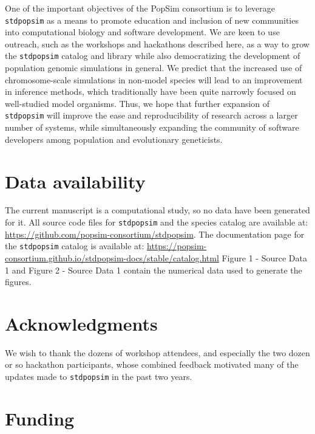 \documentclass[hidelinks]{article}
\newcommand{\stdpopsim}{\texttt{stdpopsim}\xspace}
\begin{document}
One of the important objectives of the PopSim consortium is to leverage \stdpopsim as a means to promote education and inclusion of new communities into
computational biology and software development.
We are keen to use outreach, such as the workshops and hackathons described here, 
as a way to grow the \stdpopsim catalog and library while also democratizing the development of population genomic simulations in general.
We predict that the increased use of chromosome-scale simulations in non-model species will lead to an improvement in inference methods,
which traditionally have been quite narrowly focused on well-studied model organisms.
Thus, we hope that further expansion of \stdpopsim will improve the ease and reproducibility of research across a larger number of systems,
while simultaneously expanding the community of software developers among population and evolutionary geneticists.


\section*{Data availability}\label{acknowledgements}

The current manuscript is a computational study, so no data have been generated for it.
%
All source code files for \stdpopsim and the species catalog are available at: \href{https://github.com/popsim-consortium/stdpopsim}
{https://github.com/popsim-consortium/stdpopsim}.
%
The documentation page for the \stdpopsim catalog is available at:
\href{https://popsim-consortium.github.io/stdpopsim-docs/stable/catalog.html}
{https://popsim-consortium.github.io/stdpopsim-docs/stable/catalog.html}
%
Figure 1 - Source Data 1 and Figure 2 - Source Data 1 contain the numerical data used to generate the figures.


\section*{Acknowledgments}\label{acknowledgements}

We wish to thank the dozens of workshop attendees,
and especially the two dozen or so hackathon participants,
whose combined feedback motivated many of the updates made to \stdpopsim in the past two years.

\section*{Funding}
    \label{funding}
\end{document}
